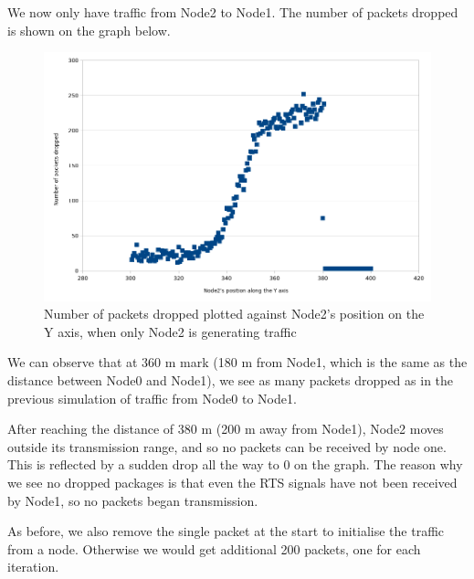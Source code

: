 \documentclass[11pt,journal]{article}
\begin{document}
	\section{}
	We now only have traffic from Node2 to Node1. The number of packets dropped is shown on the graph below.
	\begin{figure}[h]
		\centering
		\includegraphics[scale=0.6]{graph3.png}
		\caption{Number of packets dropped plotted against Node2's position on the Y axis, when only Node2 is generating traffic}
	\end{figure}
	
	We can observe that at 360 m mark (180 m from Node1, which is the same as the distance between Node0 and Node1), we see as many packets dropped as in the previous simulation of traffic from Node0 to Node1.
	
	After reaching the distance of 380 m (200 m away from Node1), Node2 moves outside its transmission range, and so no packets can be received by node one. This is reflected by a sudden drop all the way to 0 on the graph. The reason why we see no dropped packages is that even the RTS signals have not been received by Node1, so no packets began transmission.

	As before, we also remove the single packet at the start to initialise the traffic from a node. Otherwise we would get additional 200 packets, one for each iteration.

	\pagebreak
	
\end{document}
